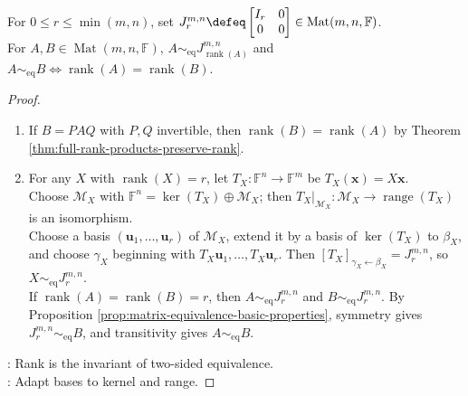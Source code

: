 \begin{theorem} \label{thm:rank-classifies-matrix-equivalence} \\
For $0\leq r\leq\min(m,n)$, set $J_r^{m,n}\defeq
\begin{bmatrix}
I_r & 0\\
0 & 0
\end{bmatrix}
\in\operatorname{Mat}(m,n,\mathbb{F})$.\\
For $A,B\in\operatorname{Mat}(m,n,\mathbb{F})$, $A\sim_{\mathrm{eq}}J_{\operatorname{rank}(A)}^{m,n}$ and $A\sim_{\mathrm{eq}}B\Longleftrightarrow \operatorname{rank}(A)=\operatorname{rank}(B)$.
\begin{proof}
\begin{enumerate}[label=\roman*.]
\setlength{\itemsep}{0pt}
\item[$(\Rightarrow)$] If $B=PAQ$ with $P,Q$ invertible, then $\operatorname{rank}(B)=\operatorname{rank}(A)$ by Theorem \ref{thm:full-rank-products-preserve-rank}.
\item[$(\Leftarrow)$] For any $X$ with $\operatorname{rank}(X)=r$, let $T_X:\mathbb{F}^n\to\mathbb{F}^m$ be $T_X(\mathbf{x})=X\mathbf{x}$.\\
Choose $\mathcal{M}_X$ with $\mathbb{F}^n=\ker(T_X)\oplus\mathcal{M}_X$; then $T_X|_{\mathcal{M}_X}:\mathcal{M}_X\to\operatorname{range}(T_X)$ is an isomorphism.\\
Choose a basis $(\mathbf{u}_1,\ldots,\mathbf{u}_r)$ of $\mathcal{M}_X$, extend it by a basis of $\ker(T_X)$ to $\beta_X$, and choose $\gamma_X$ beginning with $T_X\mathbf{u}_1,\ldots,T_X\mathbf{u}_r$. Then $[T_X]_{\gamma_X\leftarrow\beta_X}=J_r^{m,n}$, so $X\sim_{\mathrm{eq}}J_r^{m,n}$.\\
If $\operatorname{rank}(A)=\operatorname{rank}(B)=r$, then $A\sim_{\mathrm{eq}}J_r^{m,n}$ and $B\sim_{\mathrm{eq}}J_r^{m,n}$. By Proposition \ref{prop:matrix-equivalence-basic-properties}, symmetry gives $J_r^{m,n}\sim_{\mathrm{eq}}B$, and transitivity gives $A\sim_{\mathrm{eq}}B$.
\end{enumerate}
: Rank is the invariant of two-sided equivalence.\\
: Adapt bases to kernel and range.
\end{proof}
\end{theorem}

